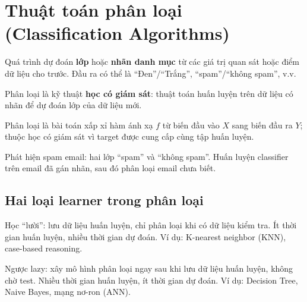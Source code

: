 \section{Thuật toán phân loại (Classification Algorithms)}
\label{sec:classification-algorithms}

\begin{dinhnghia}[title={Phân loại trong học máy}]
Quá trình dự đoán \textbf{lớp} hoặc \textbf{nhãn danh mục} từ các giá trị quan sát hoặc điểm dữ liệu cho trước.
Đầu ra có thể là ``Đen''/``Trắng'', ``spam''/``không spam'', v.v.
\end{dinhnghia}

\begin{ynghia}[title={Học có giám sát}]
Phân loại là kỹ thuật \textbf{học có giám sát}: thuật toán huấn luyện trên dữ liệu có nhãn để dự đoán lớp của dữ liệu mới.
\end{ynghia}

\begin{dinhnghia}[title={Toán học}]
Phân loại là bài toán xấp xỉ hàm ánh xạ $f$ từ biến đầu vào $X$ sang biến đầu ra $Y$; thuộc học có giám sát vì target được cung cấp cùng tập huấn luyện.
\end{dinhnghia}

\begin{vidu}[title={Ví dụ phân loại nhị phân}]
Phát hiện spam email: hai lớp ``spam'' và ``không spam''.
Huấn luyện classifier trên email đã gán nhãn, sau đó phân loại email chưa biết.
\end{vidu}

\subsection{Hai loại learner trong phân loại}

\begin{phuongphap}[title={Lazy Learners}]
Học ``lười'': lưu dữ liệu huấn luyện, chỉ phân loại khi có dữ liệu kiểm tra.
Ít thời gian huấn luyện, nhiều thời gian dự đoán.
Ví dụ: K-nearest neighbor (KNN), case-based reasoning.
\end{phuongphap}

\begin{phuongphap}[title={Eager Learners}]
Ngược lazy: xây mô hình phân loại ngay sau khi lưu dữ liệu huấn luyện, không chờ test.
Nhiều thời gian huấn luyện, ít thời gian dự đoán.
Ví dụ: Decision Tree, Naive Bayes, mạng nơ-ron (ANN).
\end{phuongphap}

